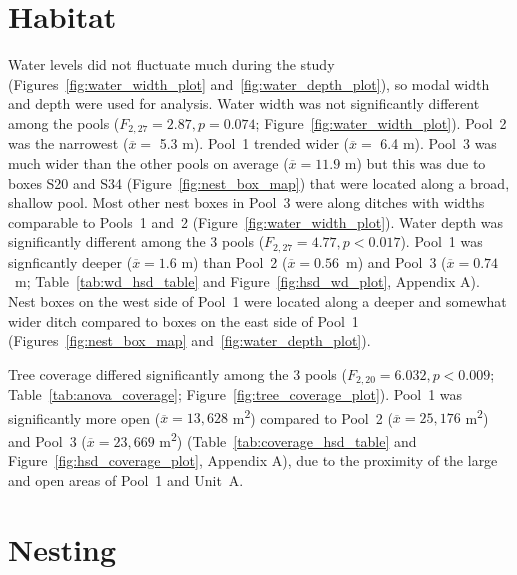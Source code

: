 
\section*{Habitat}

Water levels did not fluctuate much during the study (Figures~\ref{fig:water_width_plot} and~\ref{fig:water_depth_plot}), so  modal width and depth were used for analysis.  Water width was not significantly different among the pools ($F_{2,27} = 2.87, p = 0.074$; Figure~\ref{fig:water_width_plot}). Pool~2 was the narrowest ($\overline{x} =$ \num{5.3} \unit{\meter}). Pool~1 trended wider ($\overline{x} =$ 6.4 m). Pool~3 was much wider than the other  pools on average ($\overline{x} = 11.9$ \unit{\meter}) but this was due to boxes S20 and S34 (Figure~\ref{fig:nest_box_map}) that were located along a broad, shallow pool. Most other nest boxes in Pool~3 were along ditches with widths comparable to Pools~1 and~2  (Figure~\ref{fig:water_width_plot}). Water depth was significantly different among the 3 pools ($F_{2,27} = 4.77, p < 0.017$). Pool~1 was signficantly deeper ($\overline{x} = 1.6$ \unit{\meter}) than Pool~2 ($\overline{x} = 0.56$~\unit{\meter}) and Pool~3 ($\overline{x} = 0.74$~\unit{\meter};  Table~\ref{tab:wd_hsd_table} and Figure~\ref{fig:hsd_wd_plot}, Appendix A). Nest boxes on the west side of Pool~1 were located along a deeper and somewhat wider ditch compared to boxes on the east side of Pool~1 (Figures~\ref{fig:nest_box_map} and~\ref{fig:water_depth_plot}).  





Tree coverage differed significantly among the 3 pools ($F_{2,20} = 6.032, p < 0.009$; Table~\ref{tab:anova_coverage}; Figure~\ref{fig:tree_coverage_plot}). Pool~1 was significantly more open ($\overline{x} = 13{,}628$ \unit{\meter\squared}) compared to Pool~2 ($\overline{x} = 25{,}176$ \unit{\meter\squared}) and Pool~3 ($\overline{x} = 23{,}669$ \unit{\meter\squared}) (Table~\ref{tab:coverage_hsd_table} and Figure~\ref{fig:hsd_coverage_plot}, Appendix A), due to the proximity of the large and open areas of Pool~1 and Unit~A. 





\section*{Nesting}


